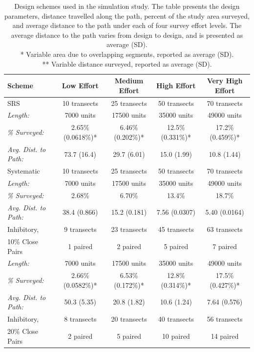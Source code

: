 \documentclass[review]{elsarticle}
\begin{document}
\begin{table}
\caption{Design schemes used in the simulation study. The table presents the
design parameters, distance travelled along the path, percent of the study area
surveyed, and average distance to the path under each of four survey effort
levels. The average distance to the path varies from design to design, and is
presented as average (SD).\\
* Variable area due to overlapping segments, reported as average (SD).\\
** Variable distance surveyed, reported as average (SD).}
\label{designtable}
\tiny
\begin{tabular}{|l|c|c|c|c|}
\hline
Scheme & Low Effort & Medium Effort & High Effort & Very High Effort \\
\hline
SRS & 10 transects & 25 transects & 50 transects & 70 transects \\
\hfill\emph{Length:} & 7000 units & 17500 units & 35000 units & 49000 units \\
\hfill\emph{\% Surveyed:} & 2.65\% (0.0618\%)* & 6.46\% (0.202\%)* & 12.5\% (0.331\%)* & 17.2\% (0.459\%)* \\
\hfill\emph{Avg. Dist. to Path:} & 73.7 (16.4) & 29.7 (6.01) & 15.0 (1.99) & 10.8 (1.44) \\
\hline
Systematic & 10 transects & 25 transects & 50 transects & 70 transects \\
\hfill\emph{Length:} & 7000 units & 17500 units & 35000 units & 49000 units \\
\hfill\emph{\% Surveyed:} & 2.68\% & 6.70\% & 13.4\% & 18.7\% \\
\hfill\emph{Avg. Dist. to Path:} & 38.4 (0.866) & 15.2 (0.181) & 7.56 (0.0307) & 5.40 (0.0164) \\
\hline
Inhibitory, & 9 transects & 23 transects & 45 transects & 63 transects \\
10\% Close Pairs & 1 paired & 2 paired & 5 paired & 7 paired \\
\hfill\emph{Length:} & 7000 units & 17500 units & 35000 units & 49000 units \\
\hfill\emph{\% Surveyed:} & 2.66\% (0.0582\%)* & 6.53\% (0.172\%)* & 12.8\% (0.314\%)* & 17.5\% (0.427\%)* \\
\hfill\emph{Avg. Dist. to Path:} & 50.3 (5.35) & 20.8 (1.82) & 10.6 (1.24) & 7.64 (0.576) \\
\hline
Inhibitory, & 8 transects & 20 transects & 40 transects & 56 transects \\
20\% Close Pairs & 2 paired & 5 paired & 10 paired & 14 paired \\

\end{tabular}
\end{table}
\end{document}
